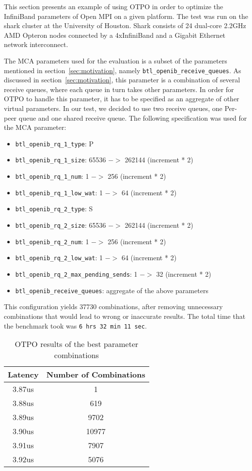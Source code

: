 This section presents an example of using OTPO in order to optimize the InfiniBand parameters of Open MPI on a given platform. The test was run on the shark cluster at the University of Houston. Shark consists of 24 dual-core 2.2GHz AMD Opteron nodes connected by a 4xInfiniBand and a Gigabit Ethernet network interconnect.

The MCA parameters used for the evaluation is a subset of the parameters mentioned in section~\ref{sec:motivation}, namely {\tt btl\_openib\_receive\_queues}. As discussed in section~\ref{sec:motivation}, this parameter is a combination of several receive queues, where each queue in turn takes other parameters. In order for OTPO to handle this parameter, it has to be specified as an aggregate of other virtual parameters. In our test, we decided to use two receive queues, one Per-peer queue and one shared receive queue. The following specification was used for the MCA parameter:

\begin{itemize}
\item {\tt btl\_openib\_rq\_1\_type}: P
\item {\tt btl\_openib\_rq\_1\_size}: 65536 $->$ 262144 (increment * 2)
\item {\tt btl\_openib\_rq\_1\_num}: 1 $->$ 256 (increment * 2)
\item {\tt btl\_openib\_rq\_1\_low\_wat}: 1 $->$ 64 (increment * 2)
\item {\tt btl\_openib\_rq\_2\_type}: S
\item {\tt btl\_openib\_rq\_2\_size}: 65536 $->$ 262144 (increment * 2)
\item {\tt btl\_openib\_rq\_2\_num}: 1 $->$ 256 (increment * 2)
\item {\tt btl\_openib\_rq\_2\_low\_wat}: 1 $->$ 64 (increment * 2)
\item {\tt btl\_openib\_rq\_2\_max\_pending\_sends}: 1 $->$ 32 (increment * 2)
\item {\tt btl\_openib\_receive\_queues}: aggregate of the above parameters
\end{itemize}

This configuration yields 37730 combinations, after removing unnecessary combinations that would lead to wrong or inaccurate results.  The total time that the benchmark took was {\tt 6 hrs 32 min 11 sec}.

\begin{table}[tb]
\centering
\begin{tabular}{|c|c|} \hline
Latency & Number of Combinations \\
\hline
3.87us  & 1\\
\hline
3.88us  & 619\\
\hline
3.89us  & 9702\\
\hline
3.90us  & 10977\\
\hline
3.91us  & 7907\\
\hline
3.92us  & 5076\\
\hline
\end{tabular}  
\caption{OTPO results of the best parameter combinations}
\label{table:results} 
\end{table}


